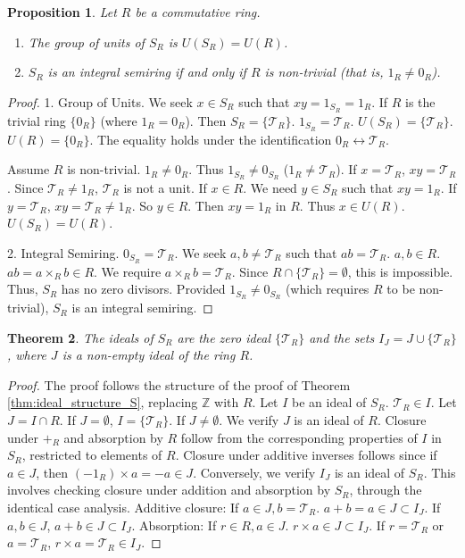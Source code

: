 \documentclass[11pt, a4paper]{article}
\theoremstyle{plain}
\newtheorem{theorem}{Theorem}[section]
\newtheorem{proposition}[theorem]{Proposition}
\theoremstyle{definition}
\numberwithin{equation}{section}
\newcommand{\Z}{\mathbb{Z}}
\newcommand{\Tobj}{\mathcal{T}} %
\newcommand{\SR}{S_{R}}
\begin{document}
\begin{proposition}\label{prop:properties_SR}
Let $R$ be a commutative ring.
\begin{enumerate}
    \item The group of units of $\SR$ is $U(\SR) = U(R)$.
    \item $\SR$ is an integral semiring if and only if $R$ is non-trivial (that is, $1_R \neq 0_R$).
\end{enumerate}
\end{proposition}
\begin{proof}
1. Group of Units. We seek $x \in \SR$ such that $xy=1_{\SR}=1_R$.
If $R$ is the trivial ring $\{0_R\}$ (where $1_R=0_R$). Then $\SR=\{\Tobj_R\}$. $1_{\SR}=\Tobj_R$. $U(\SR)=\{\Tobj_R\}$. $U(R)=\{0_R\}$. The equality holds under the identification $0_R \leftrightarrow \Tobj_R$.

Assume $R$ is non-trivial. $1_R \neq 0_R$. Thus $1_{\SR} \neq 0_{\SR}$ ($1_R \neq \Tobj_R$).
If $x=\Tobj_R$, $xy=\Tobj_R$. Since $\Tobj_R \neq 1_R$, $\Tobj_R$ is not a unit.
If $x \in R$. We need $y \in \SR$ such that $xy=1_R$. If $y=\Tobj_R$, $xy=\Tobj_R \neq 1_R$. So $y \in R$. Then $xy=1_R$ in $R$. Thus $x \in U(R)$.
$U(\SR)=U(R)$.

2. Integral Semiring. $0_{\SR}=\Tobj_R$. We seek $a, b \neq \Tobj_R$ such that $ab=\Tobj_R$.
$a, b \in R$. $ab=a\times_R b \in R$.
We require $a\times_R b = \Tobj_R$. Since $R \cap \{\Tobj_R\} = \emptyset$, this is impossible.
Thus, $\SR$ has no zero divisors. Provided $1_{\SR} \neq 0_{\SR}$ (which requires $R$ to be non-trivial), $\SR$ is an integral semiring.
\end{proof}

\begin{theorem}\label{thm:ideal_structure_SR}
The ideals of $\SR$ are the zero ideal $\{\Tobj_R\}$ and the sets $I_J = J \cup \{\Tobj_R\}$, where $J$ is a non-empty ideal of the ring $R$.
\end{theorem}
\begin{proof}
The proof follows the structure of the proof of Theorem \ref{thm:ideal_structure_S}, replacing $\Z$ with $R$.
Let $I$ be an ideal of $\SR$. $\Tobj_R \in I$. Let $J=I\cap R$. If $J=\emptyset$, $I=\{\Tobj_R\}$.
If $J\neq\emptyset$. We verify $J$ is an ideal of $R$. Closure under $+_{R}$ and absorption by $R$ follow from the corresponding properties of $I$ in $\SR$, restricted to elements of $R$. Closure under additive inverses follows since if $a \in J$, then $(-1_R)\times a = -a \in J$.
Conversely, we verify $I_J$ is an ideal of $\SR$. This involves checking closure under addition and absorption by $\SR$, through the identical case analysis.
Additive closure: If $a \in J, b=\Tobj_R$. $a+b=a \in J \subset I_J$. If $a, b \in J$, $a+b \in J \subset I_J$.
Absorption: If $r \in R, a \in J$. $r\times a \in J \subset I_J$. If $r=\Tobj_R$ or $a=\Tobj_R$, $r\times a = \Tobj_R \in I_J$.
\end{proof}
\end{document}
